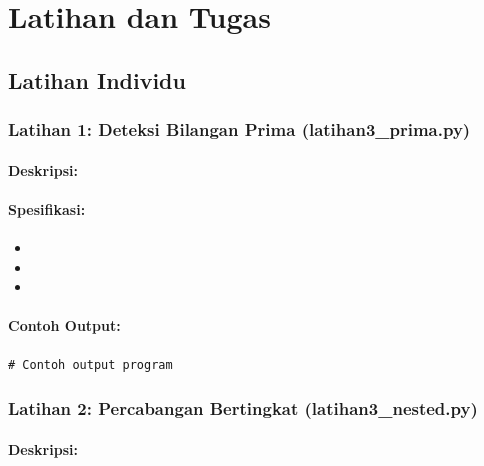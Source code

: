 \documentclass[12pt,a4paper]{article}
\begin{document}
\section{Latihan dan Tugas}

\subsection{Latihan Individu}

\subsubsection{Latihan 1: Deteksi Bilangan Prima (latihan3\_prima.py)}

\paragraph{Deskripsi:}

\paragraph{Spesifikasi:}
\begin{itemize}
    \item 
    \item 
    \item 
\end{itemize}

\paragraph{Contoh Output:}

\begin{lstlisting}
# Contoh output program
\end{lstlisting}

\subsubsection{Latihan 2: Percabangan Bertingkat (latihan3\_nested.py)}

\paragraph{Deskripsi:}
\end{document}
